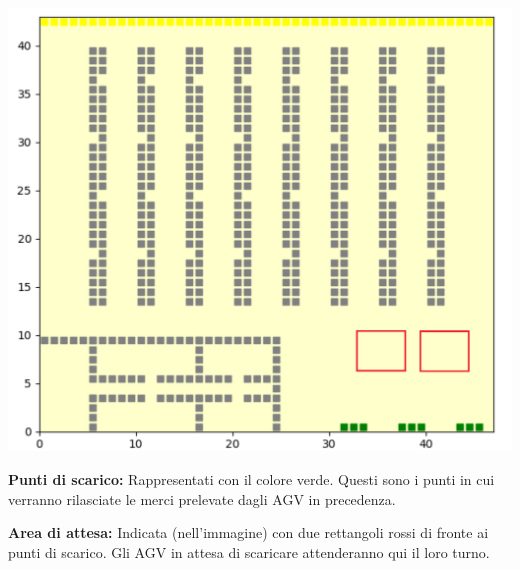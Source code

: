 \documentclass[12pt]{article}
\begin{document}
\begin{minipage}[ht]{0.45\linewidth}
\centering
\includegraphics[width=\textwidth]{Figures/Map/WaitingArea.png}
\end{minipage}

\begin{minipage}[ht]{0.45\linewidth}
\vspace{0.2cm}
\textbf{Punti di scarico:} Rappresentati con il colore verde. Questi sono i punti in cui verranno rilasciate le merci prelevate dagli AGV in precedenza.
\end{minipage}
\hspace{0.5cm}
\begin{minipage}[]{0.45\linewidth}
\vspace{0.2cm}
\textbf{Area di attesa:} Indicata (nell'immagine) con due rettangoli rossi di fronte ai punti di scarico. Gli AGV in attesa di scaricare attenderanno qui il loro turno.
\end{minipage}
\end{document}
